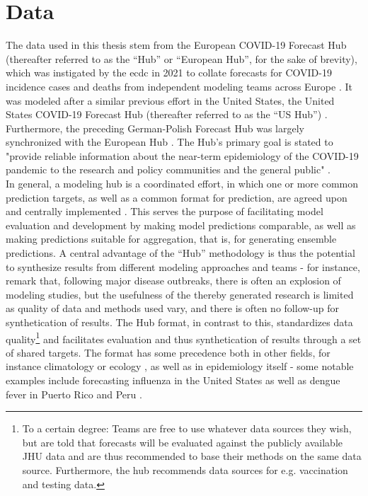 \section{Data}
The data used in this thesis stem from the European COVID-19 Forecast Hub (thereafter referred to as the ``Hub'' or ``European Hub'', for the sake of brevity), which was instigated by the \ac{ecdc} in 2021 to collate forecasts for COVID-19 incidence cases and deaths from independent modeling teams across Europe \citep{european_covid-19_forecast_hub_european_2021}. It was modeled after a similar previous effort in the United States, the United States COVID-19 Forecast Hub (thereafter referred to as the ``US Hub'') \citep{cramer_united_2021}. Furthermore, the preceding German-Polish Forecast Hub was largely synchronized with the European Hub \citep{bracher_german_2020}. The Hub's primary goal is stated to "provide reliable information about the near-term epidemiology of the COVID-19 pandemic to the research and policy communities and the general public" \citep{sherratt_predictive_2022}.\\ 
In general, a modeling hub is a coordinated effort, in which one or more common prediction targets, as well as a common format for prediction, are agreed upon and centrally implemented \citep{reich_collaborative_2022}. This serves the purpose of facilitating model evaluation and development by making model predictions comparable, as well as making predictions suitable for aggregation, that is, for generating ensemble predictions. A central advantage of the ``Hub'' methodology is thus the potential to synthesize results from different modeling approaches and teams - for instance, \cite{metcalf_opportunities_2017} remark that, following major disease outbreaks, there is often an explosion of modeling studies, but the usefulness of the thereby generated research is limited as quality of data and methods used vary, and there is often no follow-up for synthetication of results. %
The Hub format, in contrast to this, standardizes data quality\footnote{To a certain degree: Teams are free to use whatever data sources they wish, but are told that forecasts will be evaluated against the publicly available JHU data and are thus recommended to base their methods on the same data source. Furthermore, the hub recommends data sources for e.g. vaccination and testing data.} and facilitates evaluation and thus synthetication of results through a set of shared targets. The format has some precedence both in other fields, for instance climatology or ecology \citep{warszawski_inter-sectoral_2014}, as well as in epidemiology itself - some notable examples include forecasting influenza in the United States \citep{reich_collaborative_2019} as well as dengue fever in Puerto Rico and Peru \citep{johansson_open_2019}. \\
